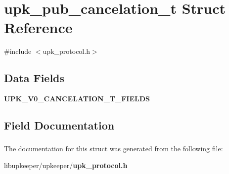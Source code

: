 \section{upk\_\-pub\_\-cancelation\_\-t Struct Reference}
\label{structupk__pub__cancelation__t}


{\ttfamily \#include $<$upk\_\-protocol.h$>$}

\subsection*{Data Fields}
\begin{DoxyCompactItemize}
\item 
{\bf UPK\_\-V0\_\-CANCELATION\_\-T\_\-FIELDS}
\end{DoxyCompactItemize}


\subsection{Field Documentation}
\subsubsection[{UPK\_\-V0\_\-CANCELATION\_\-T\_\-FIELDS}]{}\label{structupk__pub__cancelation__t_a6457691e1fbba6c131ff6f02f9dd3ff2}


The documentation for this struct was generated from the following file:\begin{DoxyCompactItemize}
\item 
libupkeeper/upkeeper/{\bf upk\_\-protocol.h}\end{DoxyCompactItemize}

